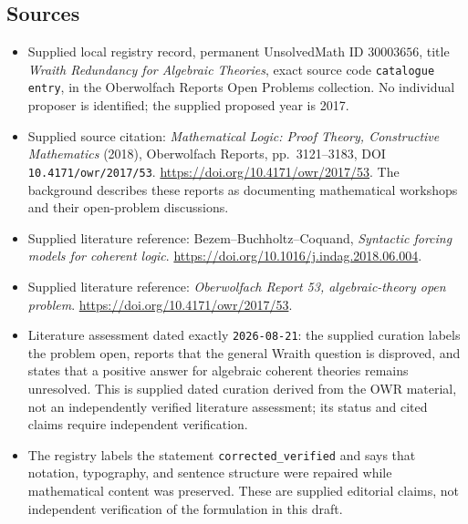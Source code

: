\documentclass[11pt]{article}
\begin{document}
\subsection{Sources}
\begin{itemize}
\item Supplied local registry record, permanent UnsolvedMath ID \(30003656\), title \emph{Wraith Redundancy for Algebraic Theories}, exact source code \texttt{catalogue entry}, in the Oberwolfach Reports Open Problems collection. No individual proposer is identified; the supplied proposed year is 2017.
\item Supplied source citation: \emph{Mathematical Logic: Proof Theory, Constructive Mathematics} (2018), Oberwolfach Reports, pp.~3121--3183, DOI \texttt{10.4171/owr/2017/53}. \url{https://doi.org/10.4171/owr/2017/53}. The background describes these reports as documenting mathematical workshops and their open-problem discussions.
\item Supplied literature reference: Bezem--Buchholtz--Coquand, \emph{Syntactic forcing models for coherent logic}. \url{https://doi.org/10.1016/j.indag.2018.06.004}.
\item Supplied literature reference: \emph{Oberwolfach Report 53, algebraic-theory open problem}. \url{https://doi.org/10.4171/owr/2017/53}.
\item Literature assessment dated exactly \texttt{2026-08-21}: the supplied curation labels the problem open, reports that the general Wraith question is disproved, and states that a positive answer for algebraic coherent theories remains unresolved. This is supplied dated curation derived from the OWR material, not an independently verified literature assessment; its status and cited claims require independent verification.
\item The registry labels the statement \texttt{corrected\_verified} and says that notation, typography, and sentence structure were repaired while mathematical content was preserved. These are supplied editorial claims, not independent verification of the formulation in this draft.
\end{itemize}
\end{document}
